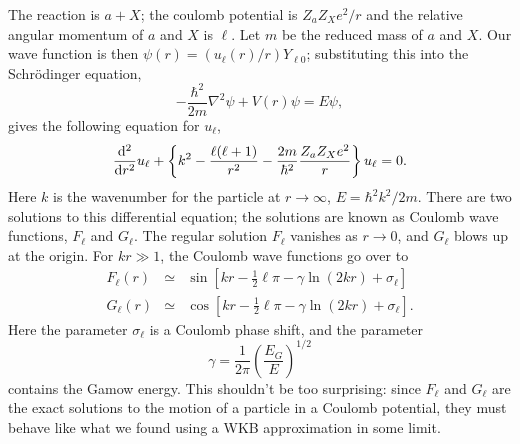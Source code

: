 The reaction is $a + X$; the coulomb potential is $Z_{a}Z_{X}e^{2}/r$ and the relative angular momentum of $a$ and $X$ is $\ell$.  Let $m$ be the reduced mass of $a$ and $X$.  Our wave function is then $\psi(r) = (u_{\ell}(r)/r)Y_{\ell 0}$; substituting this into the Schr\"odinger equation,
\[
-\frac{\hbar^{2}}{2m}\nabla^{2}\psi + V(r)\psi  = E\psi,
\]
gives the following equation for $u_{\ell}$,
\[
\frac{\mathrm{d}^{2}}{\mathrm{d} r^{2}} u_{\ell} + \left\{ k^{2} - \frac{\ell(\ell + 1)}{r^{2}} - \frac{2m}{\hbar^{2}}\frac{Z_{a}Z_{X}e^{2}}{r} \right\}u_{\ell} = 0.
\]
Here $k$ is the wavenumber for the particle at $r\to\infty$, $E = \hbar^{2}k^{2}/2m$. There are two solutions to this differential equation; the solutions are known as Coulomb wave functions, $F_{\ell}$ and $G_{\ell}$.  The regular solution $F_{\ell}$ vanishes as $r\to 0$, and $G_{\ell}$ blows up at the origin. 
For $kr \gg 1$, the Coulomb wave functions go over to
\begin{eqnarray}\label{e.coulombF}
F_{\ell}(r) &\simeq& \sin\left[ kr - \frac{1}{2}\ell\pi -\gamma\ln(2kr) + \sigma_{\ell}\right]\\
G_{\ell}(r) &\simeq& \cos\left[ kr - \frac{1}{2}\ell\pi -\gamma\ln(2kr) + \sigma_{\ell}\right].
\label{e.coulombG}
\end{eqnarray}
Here the parameter $\sigma_{\ell}$ is a Coulomb phase shift, and the parameter
\[ \gamma = \frac{1}{2\pi}\left(\frac{E_{G}}{E}\right)^{1/2} \]
contains the Gamow energy.  This shouldn't be too surprising: since $F_{\ell}$ and $G_{\ell}$ are the exact solutions to the motion of a particle in a Coulomb potential, they must behave like what we found using a WKB approximation in some limit.

